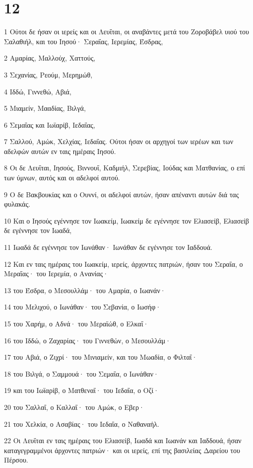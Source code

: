 \chapter{12}

\par 1 Ούτοι δε ήσαν οι ιερείς και οι Λευΐται, οι αναβάντες μετά του Ζοροβάβελ υιού του Σαλαθιήλ, και του Ιησού· Σεραΐας, Ιερεμίας, Έσδρας,
\par 2 Αμαρίας, Μαλλούχ, Χαττούς,
\par 3 Σεχανίας, Ρεούμ, Μερημώθ,
\par 4 Ιδδώ, Γιννεθώ, Αβιά,
\par 5 Μιαμείν, Μααδίας, Βιλγά,
\par 6 Σεμαΐας και Ιωϊαρίβ, Ιεδαΐας,
\par 7 Σαλλού, Αμώκ, Χελχίας, Ιεδαΐας. Ούτοι ήσαν οι αρχηγοί των ιερέων και των αδελφών αυτών εν ταις ημέραις Ιησού.
\par 8 Οι δε Λευΐται, Ιησούς, Βιννουΐ, Καδμιήλ, Σερεβίας, Ιούδας και Ματθανίας, ο επί των ύμνων, αυτός και οι αδελφοί αυτού.
\par 9 Ο δε Βακβουκίας και ο Ουννί, οι αδελφοί αυτών, ήσαν απέναντι αυτών διά τας φυλακάς.
\par 10 Και ο Ιησούς εγέννησε τον Ιωακείμ, Ιωακείμ δε εγέννησε τον Ελιασείβ, Ελιασείβ δε εγέννησε τον Ιωαδά,
\par 11 Ιωαδά δε εγέννησε τον Ιωνάθαν· Ιωνάθαν δε εγέννησε τον Ιαδδουά.
\par 12 Και εν ταις ημέραις του Ιωακείμ, ιερείς, άρχοντες πατριών, ήσαν του Σεραΐα, ο Μεραΐας· του Ιερεμία, ο Ανανίας·
\par 13 του Έσδρα, ο Μεσουλλάμ· του Αμαρία, ο Ιωανάν·
\par 14 του Μελιχού, ο Ιωνάθαν· του Σεβανία, ο Ιωσήφ·
\par 15 του Χαρήμ, ο Αδνά· του Μεραϊώθ, ο Ελκαΐ·
\par 16 του Ιδδώ, ο Ζαχαρίας· του Γιννεθών, ο Μεσουλλάμ·
\par 17 του Αβιά, ο Ζιχρί· του Μινιαμείν, και του Μωαδία, ο Φιλταΐ·
\par 18 του Βιλγά, ο Σαμμουά· του Σεμαΐα, ο Ιωνάθαν·
\par 19 και του Ιωϊαρίβ, ο Ματθεναΐ· του Ιεδαΐα, ο Οζί·
\par 20 του Σαλλαΐ, ο Καλλαΐ· του Αμώκ, ο Εβερ·
\par 21 του Χελκία, ο Ασαβίας· του Ιεδαΐα, ο Ναθαναήλ.
\par 22 Οι Λευΐται εν ταις ημέραις του Ελιασείβ, Ιωαδά και Ιωανάν και Ιαδδουά, ήσαν καταγεγραμμένοι άρχοντες πατριών· και οι ιερείς, επί της βασιλείας Δαρείου του Πέρσου.
